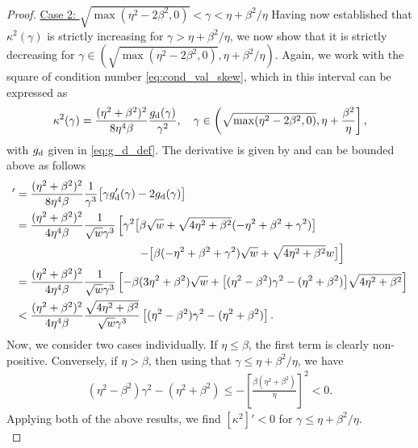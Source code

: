 \documentclass[a4paper,10pt]{article}
\begin{document}
{\begin{itemize}
\begin{proof}
\underline{Case 2: $\sqrt{\max(\eta^2 - 2 \beta^2, 0)} < \gamma < \eta + \beta^2/\eta$} \quad Having now established that $\kappa^2(\gamma)$ is strictly increasing for $\gamma > \eta + \beta^2/\eta$, we now show that it is strictly decreasing for $\gamma \in (\sqrt{\max(\eta^2 - 2 \beta^2, 0)}, \eta + \beta^2/\eta)$. Again, we work with the square of condition number \eqref{eq:cond_val_skew}, which in this interval can be expressed as
\begin{align}
\label{eq:cond_2}
\kappa^2(\gamma) = 
\frac{(\eta^2 + \beta^2)^2}{8 \eta^4 \beta} \frac{g_{\rm d}(\gamma)}{\gamma^2},
\quad
\gamma \in \left( \sqrt{\max(\eta^2 - 2 \beta^2, 0)}, \eta + \frac{\beta^2}{\eta} \right],
\end{align}
with $g_{\rm d}$ given in \eqref{eq:g_d_def}. The derivative is given by and can be bounded above as follows
\begin{align*}
[\kappa^2(\gamma)]' 
&= 
\frac{(\eta^2 + \beta^2)^2}{8 \eta^4 \beta} \frac{1}{\gamma^3} 
\big[  \gamma g_{\rm d}'(\gamma) - 2 g_{\rm d}(\gamma)
\big] \\
&=
\frac{(\eta^2 + \beta^2)^2}{4 \eta^4 \beta} \frac{1}{\sqrt{w} \gamma^3} 
\left[
\gamma^2
\big[\beta \sqrt{w} + \sqrt{4 \eta^2 + \beta^2} (-\eta^2 + \beta^2 + \gamma^2) \big] \right.\\ 
&  \left. 
\hspace{25ex} -\big[\beta(-\eta^2+\beta^2+\gamma^2) \sqrt{w} + \sqrt{4 \eta^2 + \beta^2} w \big] 
\right] \\
&=
\frac{(\eta^2 + \beta^2)^2}{4 \eta^4 \beta} \frac{1}{\sqrt{w} \gamma^3} 
\left[
-\beta(3 \eta^2 + \beta^2) \sqrt{w} + \big[ (\eta^2 - \beta^2) \gamma^2 -(\eta^2  + \beta^2) \big] \sqrt{4 \eta^2 + \beta^2} 
\right] \\
&<
\frac{(\eta^2 + \beta^2)^2}{4 \eta^4 \beta} \frac{\sqrt{4 \eta^2 + \beta^2} }{\sqrt{w} \gamma^3} 
\left[ (\eta^2 - \beta^2) \gamma^2 - (\eta^2  + \beta^2) \right].
\end{align*}
Now, we consider two cases individually. If $\eta \leq \beta$, the first term is clearly non-positive. Conversely, if $\eta > \beta$, then using that $\gamma \leq \eta + \beta^2/\eta$, we have 
\begin{align*}
(\eta^2 - \beta^2) \gamma^2 - (\eta^2 + \beta^2) \leq - \left[ \frac{\beta (\eta^2 + \beta^2)}{\eta} \right]^2 < 0.
\end{align*}
Applying both of the above results, we find $[\kappa^2]' < 0$ for $\gamma \leq \eta + \beta^2 / \eta$. \\


\end{proof}
\end{itemize}}
\end{document}
